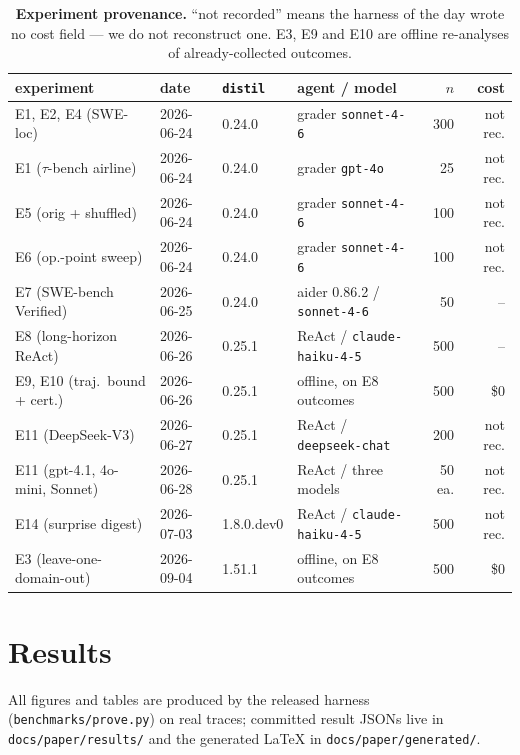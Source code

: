 \documentclass{article}
\newcommand{\sweEsevenTotalCost}{--}}
\newcommand{\sweEeightTotalCost}{--}}
\begin{document}
\begin{table}[t]
\centering\small
\caption{\textbf{Experiment provenance.} ``not recorded'' means the harness of the day wrote
no cost field --- we do not reconstruct one. E3, E9 and E10 are offline re-analyses of
already-collected outcomes.}
\label{tab:provenance}
\begin{tabular}{@{}llllrr@{}}
\toprule
experiment & date & \texttt{distil} & agent / model & $n$ & cost \\
\midrule
E1, E2, E4 (SWE-loc) & 2026-06-24 & 0.24.0 & grader \texttt{sonnet-4-6} & 300 & not rec. \\
E1 ($\tau$-bench airline) & 2026-06-24 & 0.24.0 & grader \texttt{gpt-4o} & 25 & not rec. \\
E5 (orig + shuffled) & 2026-06-24 & 0.24.0 & grader \texttt{sonnet-4-6} & 100 & not rec. \\
E6 (op.-point sweep) & 2026-06-24 & 0.24.0 & grader \texttt{sonnet-4-6} & 100 & not rec. \\
E7 (SWE-bench Verified) & 2026-06-25 & 0.24.0 & aider 0.86.2 / \texttt{sonnet-4-6} & 50 & \sweEsevenTotalCost \\
E8 (long-horizon ReAct) & 2026-06-26 & 0.25.1 & ReAct / \texttt{claude-haiku-4-5} & 500 & \sweEeightTotalCost \\
E9, E10 (traj.\ bound + cert.) & 2026-06-26 & 0.25.1 & offline, on E8 outcomes & 500 & \$0 \\
E11 (DeepSeek-V3) & 2026-06-27 & 0.25.1 & ReAct / \texttt{deepseek-chat} & 200 & not rec. \\
E11 (gpt-4.1, 4o-mini, Sonnet) & 2026-06-28 & 0.25.1 & ReAct / three models & 50 ea. & not rec. \\
E14 (surprise digest) & 2026-07-03 & 1.8.0.dev0 & ReAct / \texttt{claude-haiku-4-5} & 500 & not rec. \\
E3 (leave-one-domain-out) & 2026-09-04 & 1.51.1 & offline, on E8 outcomes & 500 & \$0 \\
\bottomrule
\end{tabular}
\end{table}

\section{Results}
\label{sec:results}
{\sloppy
All figures and tables are produced by the released harness
(\texttt{benchmarks/prove.py}) on real traces; committed result JSONs live in
\texttt{docs/paper/results/} and the generated LaTeX in
\texttt{docs/paper/generated/}.\par}
\end{document}
